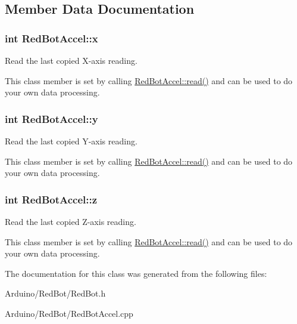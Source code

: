 \subsection{Member Data Documentation}
\hypertarget{class_red_bot_accel_a190369eae35db9db9d406dab70ec90ad}{
\subsubsection[{x}]{\setlength{\rightskip}{0pt plus 5cm}int Red\-Bot\-Accel\-::x}}\label{class_red_bot_accel_a190369eae35db9db9d406dab70ec90ad}
Read the last copied X-\/axis reading.

This class member is set by calling \hyperlink{class_red_bot_accel_a2b205e64828e57dcf2fb35ee81d5e731}{Red\-Bot\-Accel\-::read()} and can be used to do your own data processing. \hypertarget{class_red_bot_accel_a1a4efe3197febc4632b8fc48237bb440}{
\subsubsection[{y}]{\setlength{\rightskip}{0pt plus 5cm}int Red\-Bot\-Accel\-::y}}\label{class_red_bot_accel_a1a4efe3197febc4632b8fc48237bb440}
Read the last copied Y-\/axis reading.

This class member is set by calling \hyperlink{class_red_bot_accel_a2b205e64828e57dcf2fb35ee81d5e731}{Red\-Bot\-Accel\-::read()} and can be used to do your own data processing. \hypertarget{class_red_bot_accel_a8678bd23d5f1913950b5c97b9487a9da}{
\subsubsection[{z}]{\setlength{\rightskip}{0pt plus 5cm}int Red\-Bot\-Accel\-::z}}\label{class_red_bot_accel_a8678bd23d5f1913950b5c97b9487a9da}
Read the last copied Z-\/axis reading.

This class member is set by calling \hyperlink{class_red_bot_accel_a2b205e64828e57dcf2fb35ee81d5e731}{Red\-Bot\-Accel\-::read()} and can be used to do your own data processing. 

The documentation for this class was generated from the following files\-:\begin{DoxyCompactItemize}
\item 
Arduino/\-Red\-Bot/Red\-Bot.\-h\item 
Arduino/\-Red\-Bot/Red\-Bot\-Accel.\-cpp\end{DoxyCompactItemize}
